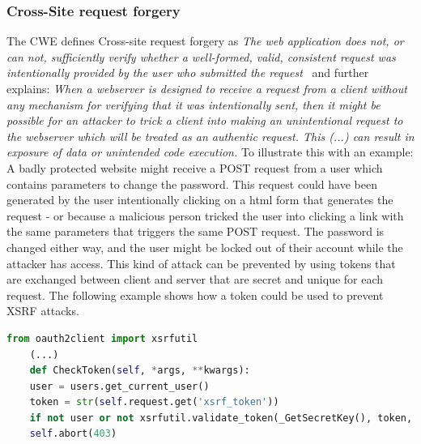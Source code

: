 \documentclass[
a4paper,
pagesize,
pdftex,
12pt,
twoside, %
BCOR=5mm, %
ngerman,
fleqn,
final,
]{scrartcl}
\begin{document}
	\subsubsection{Cross-Site request forgery}
	The CWE defines Cross-site request forgery as \textit{The web application does not, or can not, sufficiently verify whether a well-formed, valid, consistent request was intentionally provided by the user who submitted the request}~\cite{CommonWeaknessEnumeration.19.9.2019b} and further explains: \textit{When a webserver is designed to receive a request from a client without any mechanism for verifying that it was intentionally sent, then it might be possible for an attacker to trick a client into making an unintentional request to the webserver which will be treated as an authentic request. This (...) can result in exposure of data or unintended code execution.} To illustrate this with an example: A badly protected website might receive a POST request from a user which contains parameters to change the password. This request could have been generated by the user intentionally clicking on a html form that generates the request - or because a malicious person tricked the user into clicking a link with the same parameters that triggers the same POST request. The password is changed either way, and the user might be locked out of their account while the attacker has access. This kind of attack can be prevented by using tokens that are exchanged between client and server that are secret and unique for each request. The following example shows how a token could be used to prevent XSRF attacks.
	\begin{lstlisting}[language=Python, showstringspaces=False]
	from oauth2client import xsrfutil
	(...)
	def CheckToken(self, *args, **kwargs):
	user = users.get_current_user()
	token = str(self.request.get('xsrf_token'))
	if not user or not xsrfutil.validate_token(_GetSecretKey(), token, user.user_id()):
	self.abort(403)
	
	\end{lstlisting}
	
\end{document}
